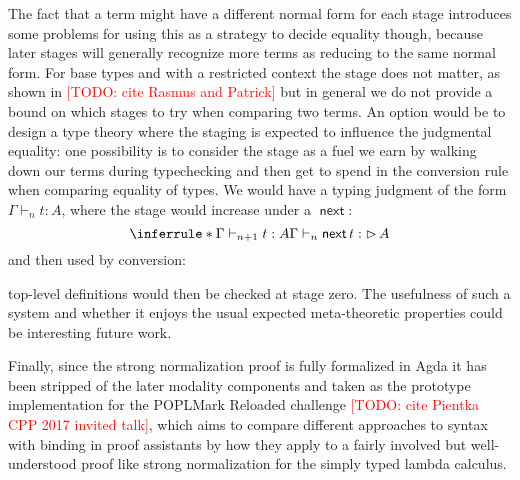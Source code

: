 \documentclass{book}
\newcommand{\TODO}[1]{\textcolor{red}{[TODO: #1]}}
\DeclareMathOperator{\Later}{\vartriangleright}
\DeclareMathOperator{\next}{\ensuremath{\mathsf{next}}}
\begin{document}
  The fact that a term might have a different normal form for each
  stage introduces some problems for using this as a strategy to
  decide equality though, because later stages will generally
  recognize more terms as reducing to the same normal form.
  For base types and with a restricted context the stage does not
  matter, as shown in \TODO{cite Rasmus and Patrick} but in general we do
  not provide a bound on which stages to try when comparing two terms.
  An option would be to design a type theory where the staging is expected
  to influence the judgmental equality: one possibility is to consider
  the stage as a fuel we earn by walking down our terms during
  typechecking and then get to spend in the conversion rule when
  comparing equality of types.
  We would have a typing judgment of the form $\Gamma \vdash_n t : A$, where the stage would increase under a $\next$:
  \[
  \inferrule*{\Gamma \vdash_{n+1} t : A}
             {\Gamma \vdash_n \next t : \Later A}
  \]
  and then used by conversion:
  top-level definitions would then be checked at stage zero. The
  usefulness of such a system and whether it enjoys the usual expected
  meta-theoretic properties could be interesting future work.

  Finally, since the strong normalization proof is fully formalized in
  Agda it has been stripped of the later modality components and taken
  as the prototype implementation for the POPLMark Reloaded challenge
  \TODO{cite Pientka CPP 2017 invited talk},
  which aims to compare different approaches to syntax with binding in
  proof assistants by how they apply to a fairly involved but
  well-understood proof like strong normalization for the simply typed
  lambda calculus.

\end{document}
